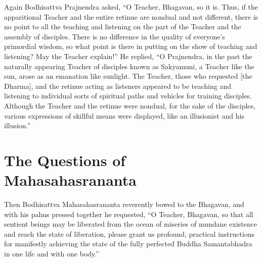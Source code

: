 \documentclass[a4paper,11pt,twoside,final]{book}
\begin{document}
Again Bodhisattva Prajnendra asked, ``O Teacher, Bhagavan, so it
is. Thus, if the apparitional Teacher and the entire retinue are
nondual and not different, there is no point to all the teaching and
listening on the part of the Teacher and the assembly of
disciples. There is no difference in the quality of everyone's
primordial wisdom, so what point is there in putting on the show of
teaching and listening? May the Teacher explain!''  He replied, ``O
Prajnendra, in the past the naturally appearing Teacher of disciples
known as Sakyamuni, a Teacher like the sun, arose as an emanation like
sunlight. The Teacher, those who requested [the Dharma], and the
retinue acting as listeners appeared to be teaching and listening to
individual sorts of spiritual paths and vehicles for training
disciples. Although the Teacher and the retinue were nondual, for the
sake of the disciples, various expressions of skillful means were
displayed, like an illusionist and his illusion.''

\section{The Questions of Mahasahasrananta}

Then Bodhisattva Mahasahasrananta reverently bowed to the Bhagavan,
and with his palms pressed together he requested, ``O Teacher,
Bhagavan, so that all sentient beings may be liberated from the ocean
of miseries of mundane existence and reach the state of liberation,
please grant us profound, practical instructions for manifestly
achieving the state of the fully perfected Buddha Samantabhadra in one
life and with one body.'' 
\end{document}
